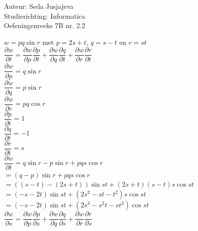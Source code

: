 \documentclass[a4paper]{article}
\begin{document}
\noindent \large Auteur: Seda Jusjajeva\\
\noindent \large Studierichting: Informatica\\
\noindent \large Oefeningenreeks 7B nr. 2.2\\

\medskip

\normalsize


$w = pq\sin r$ met $p = 2s + t$, $q = s - t$ en $r = st$ \\

$\dfrac{\partial w}{\partial t} = \dfrac{\partial w}{\partial p} \dfrac{\partial p}{\partial t} + \dfrac{\partial w}{\partial q} \dfrac{\partial q}{\partial t} + \dfrac{\partial w}{\partial r} \dfrac{\partial r}{\partial t}$ \\

$\dfrac{\partial w}{\partial p} = q\sin r$ \\

$\dfrac{\partial w}{\partial q} = p\sin r$ \\

$\dfrac{\partial w}{\partial r} = pq\cos r$ \\

$\dfrac{\partial p}{\partial t} = 1$ \\

$\dfrac{\partial q}{\partial t} = -1$ \\

$\dfrac{\partial r}{\partial t} = s$ \\

$\dfrac{\partial w}{\partial t} = q\sin r - p\sin r + pqs\cos r $ \\

$= (q - p)\sin r + pqs\cos r $ \\

$= ((s - t) - (2s + t))\sin st + (2s + t)(s - t)s\cos st $ \\

$= (-s - 2t)\sin st + (2s^2 - st - t^2)s\cos st $ \\


$= (-s - 2t)\sin st + (2s^3 - s^2t - st^2)\cos st $ \\



$\dfrac{\partial w}{\partial s} = \dfrac{\partial w}{\partial p} \dfrac{\partial p}{\partial s} + \dfrac{\partial w}{\partial q} \dfrac{\partial q}{\partial s} + \dfrac{\partial w}{\partial r} \dfrac{\partial r}{\partial s}$ \\
\end{document}
